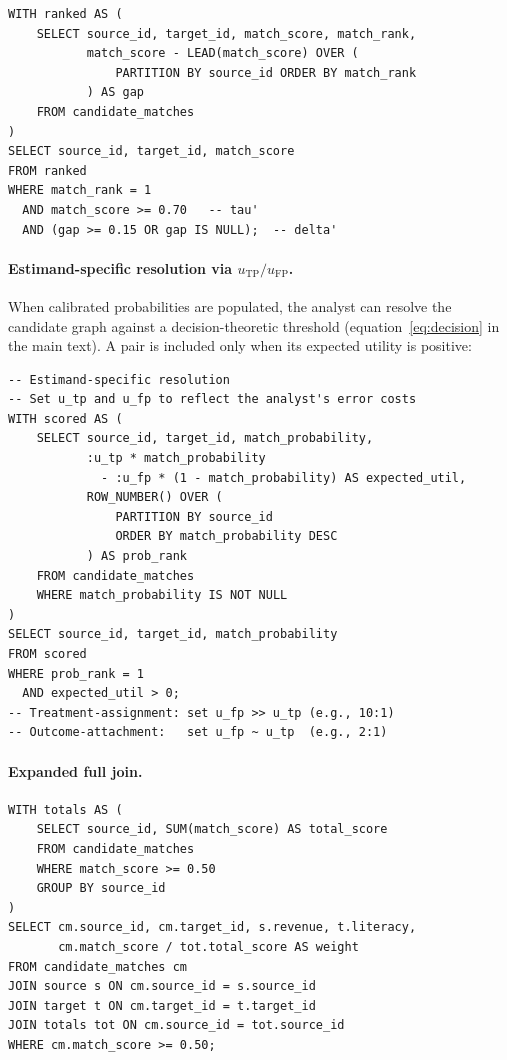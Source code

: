 \begin{lstlisting}[style=sql]
WITH ranked AS (
    SELECT source_id, target_id, match_score, match_rank,
           match_score - LEAD(match_score) OVER (
               PARTITION BY source_id ORDER BY match_rank
           ) AS gap
    FROM candidate_matches
)
SELECT source_id, target_id, match_score
FROM ranked
WHERE match_rank = 1
  AND match_score >= 0.70   -- tau'
  AND (gap >= 0.15 OR gap IS NULL);  -- delta'
\end{lstlisting}

\paragraph{Estimand-specific resolution via $u_{\mathrm{TP}}/u_{\mathrm{FP}}$.}

When calibrated probabilities are populated, the analyst can resolve the candidate graph against a decision-theoretic threshold (equation~\ref{eq:decision} in the main text). A pair is included only when its expected utility is positive:

\begin{lstlisting}[style=sql]
-- Estimand-specific resolution
-- Set u_tp and u_fp to reflect the analyst's error costs
WITH scored AS (
    SELECT source_id, target_id, match_probability,
           :u_tp * match_probability
             - :u_fp * (1 - match_probability) AS expected_util,
           ROW_NUMBER() OVER (
               PARTITION BY source_id
               ORDER BY match_probability DESC
           ) AS prob_rank
    FROM candidate_matches
    WHERE match_probability IS NOT NULL
)
SELECT source_id, target_id, match_probability
FROM scored
WHERE prob_rank = 1
  AND expected_util > 0;
-- Treatment-assignment: set u_fp >> u_tp (e.g., 10:1)
-- Outcome-attachment:   set u_fp ~ u_tp  (e.g., 2:1)
\end{lstlisting}

\paragraph{Expanded full join.}

\begin{lstlisting}[style=sql]
WITH totals AS (
    SELECT source_id, SUM(match_score) AS total_score
    FROM candidate_matches
    WHERE match_score >= 0.50
    GROUP BY source_id
)
SELECT cm.source_id, cm.target_id, s.revenue, t.literacy,
       cm.match_score / tot.total_score AS weight
FROM candidate_matches cm
JOIN source s ON cm.source_id = s.source_id
JOIN target t ON cm.target_id = t.target_id
JOIN totals tot ON cm.source_id = tot.source_id
WHERE cm.match_score >= 0.50;
\end{lstlisting}

